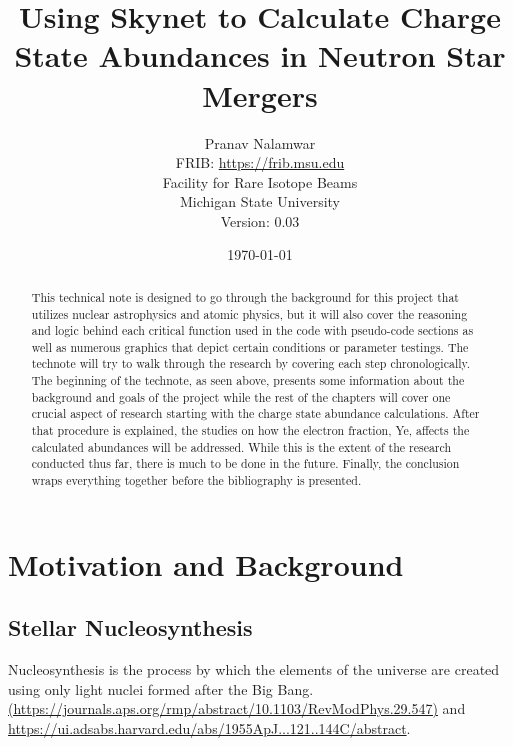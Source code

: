 \documentclass[11pt,a4paper]{article}
\begin{document}
\title{Using Skynet to Calculate Charge State Abundances in Neutron Star Mergers}

\author{Pranav Nalamwar\\FRIB: \url{https://frib.msu.edu}\\Facility for Rare Isotope Beams\\Michigan State University\\Version: 0.03} 
\date{\today}
\maketitle

\begin{abstract}
This technical note is designed to go through the background for this project that utilizes nuclear astrophysics and atomic physics, but it will also cover the reasoning and logic behind each critical function used in the code with pseudo-code sections as well as numerous graphics that depict certain conditions or parameter testings. The technote will try to walk through the research by covering each step chronologically. The beginning of the technote, as seen above, presents some information about the background and goals of the project while the rest of the chapters will cover one crucial aspect of research starting with the charge state abundance calculations. After that procedure is explained, the studies on how the electron fraction, Ye, affects the calculated abundances will be addressed. While this is the extent of the research conducted thus far, there is much to be done in the future. Finally, the conclusion wraps everything together before the bibliography is presented.

\end{abstract}

\tableofcontents
\newpage

\section{Motivation and Background}

\subsection{Stellar Nucleosynthesis}

Nucleosynthesis is the process by which the elements of the universe are created using only light nuclei formed after the Big Bang. \url{(https://journals.aps.org/rmp/abstract/10.1103/RevModPhys.29.547)} and \url{https://ui.adsabs.harvard.edu/abs/1955ApJ...121..144C/abstract}.  
\end{document}
